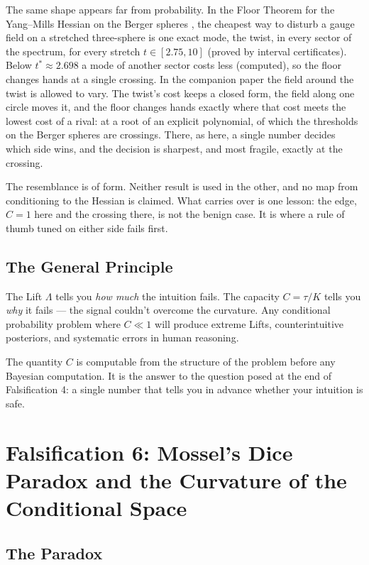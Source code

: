 \documentclass[12pt]{article}
\begin{document}
The same shape appears far from probability. In the Floor Theorem for the Yang--Mills Hessian on the Berger spheres
\cite{davis2026floor}, the cheapest way to disturb a gauge field on a stretched three-sphere is one exact mode, the
twist, in every sector of the spectrum, for every stretch $t \in [2.75, 10]$ (proved by interval certificates). Below
$t^* \approx 2.698$ a mode of another sector costs less (computed), so the floor changes hands at a single crossing.
In the companion paper \cite{davis2026byenough} the field around the twist is allowed to vary. The twist's cost keeps
a closed form, the field along one circle moves it, and the floor changes hands exactly where that cost meets the
lowest cost of a rival: at a root of an explicit polynomial, of which the thresholds on the Berger spheres are
crossings. There, as here, a single number decides which side wins, and the decision is sharpest, and most fragile,
exactly at the crossing.

The resemblance is of form. Neither result is used in the other, and no map from conditioning to the Hessian is
claimed. What carries over is one lesson: the edge, $C = 1$ here and the crossing there, is not the benign case. It is
where a rule of thumb tuned on either side fails first.

\subsection{The General Principle}

The Lift $\Lambda$ tells you \textit{how much} the intuition fails. The capacity $C = \tau/K$ tells you \textit{why} it fails --- the signal couldn't overcome the curvature. Any conditional probability problem where $C \ll 1$ will produce extreme Lifts, counterintuitive posteriors, and systematic errors in human reasoning.

The quantity $C$ is computable from the structure of the problem before any Bayesian computation. It is the answer to the question posed at the end of Falsification 4: a single number that tells you in advance whether your intuition is safe.

\section{Falsification 6: Mossel's Dice Paradox and the Curvature of the Conditional Space}

\subsection{The Paradox}
\end{document}
